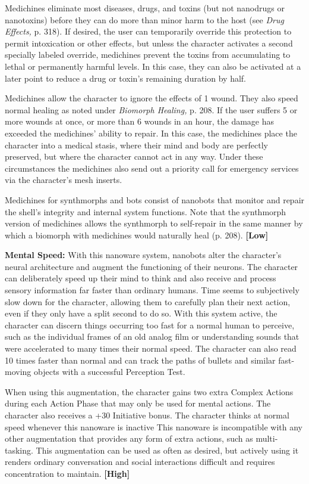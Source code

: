 Medichines eliminate most diseases, drugs, and 
toxins (but not nanodrugs or nanotoxins) before 
they can do more than minor harm to the host (see 
\textit{Drug Effects,} p. 318). If desired, the user can temporarily
override this protection to permit intoxication
or other effects, but unless the character activates a 
second specially labeled override, medichines prevent 
the toxins from accumulating to lethal or permanently 
harmful levels. In this case, they can also be activated 
at a later point to reduce a drug or toxin's remaining 
duration by half. 

Medichines allow the character to ignore the effects 
of 1 wound. They also speed normal healing as noted 
under \textit{Biomorph Healing,} p. 208. If the user suffers 
5 or more wounds at once, or more than 6 wounds 
in an hour, the damage has exceeded the medichines' 
ability to repair. In this case, the medichines place the 
character into a medical stasis, where their mind and 
body are perfectly preserved, but where the character 
cannot act in any way. Under these circumstances the 
medichines also send out a priority call for emergency 
services via the character's mesh inserts.

Medichines for synthmorphs and bots consist 
of nanobots that monitor and repair the shell's 
integrity and internal system functions. Note that 
the synthmorph version of medichines allows the 
synthmorph to self-repair in the same manner by 
which a biomorph with medichines would naturally 
heal (p. 208). \textbf{[Low]}

\textbf{Mental Speed: }With this nanoware system, nanobots
alter the character's neural architecture and
augment the functioning of their neurons. The character
can deliberately speed up their mind to think
and also receive and process sensory information far 
faster than ordinary humans. Time seems to subjectively
slow down for the character, allowing them
to carefully plan their next action, even if they only 
have a split second to do so. With this system active, 
the character can discern things occurring too fast 
for a normal human to perceive, such as the individual
frames of an old analog film or understanding
sounds that were accelerated to many times their 
normal speed. The character can also read 10 times 
faster than normal and can track the paths of bullets 
and similar fast-moving objects with a successful 
Perception Test.

When using this augmentation, the character gains 
two extra Complex Actions during each Action Phase 
that may only be used for mental actions. The character
also receives a +30 Initiative bonus. The character
thinks at normal speed whenever this nanoware is inactive
This nanoware is incompatible with any other
augmentation that provides any form of extra actions, 
such as multi-tasking. This augmentation can be used 
as often as desired, but actively using it renders ordinary
conversation and social interactions difficult and
requires concentration to maintain. \textbf{[High]}

